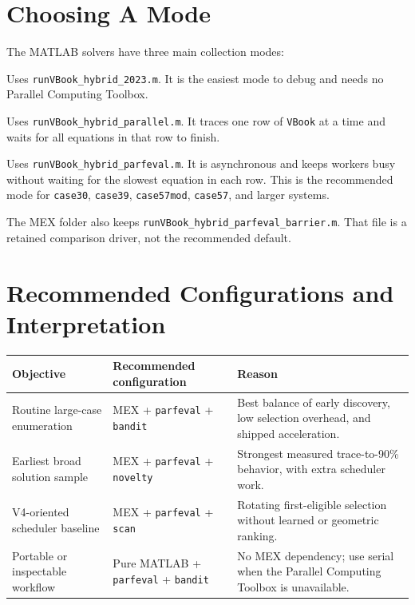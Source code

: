 \documentclass[11pt,a4paper]{article}
\newcommand{\code}[1]{\texttt{#1}}
\begin{document}
\section{Choosing A Mode}

The MATLAB solvers have three main collection modes:

\begin{description}[leftmargin=0em,style=nextline]
\item[\code{serial}] Uses \code{runVBook_hybrid_2023.m}. It is the easiest mode to debug
and needs no Parallel Computing Toolbox.
\item[\code{parfor}] Uses \code{runVBook_hybrid_parallel.m}. It traces one row of
\code{VBook} at a time and waits for all equations in that row to finish.
\item[\code{parfeval}] Uses \code{runVBook_hybrid_parfeval.m}. It is asynchronous and keeps
workers busy without waiting for the slowest equation in each row. This is the recommended
mode for \code{case30}, \code{case39}, \code{case57mod}, \code{case57}, and larger systems.
\end{description}

The MEX folder also keeps \code{runVBook_hybrid_parfeval_barrier.m}. That file is a
retained comparison driver, not the recommended default.

\section{Recommended Configurations and Interpretation}

\begin{center}\small
\begin{tabular}{@{}p{}p{}p{}@{}}
\toprule
\textbf{Objective} & \textbf{Recommended configuration} & \textbf{Reason}\\
\midrule
Routine large-case enumeration & MEX + \code{parfeval} + \code{bandit} &
Best balance of early discovery, low selection overhead, and shipped acceleration.\\
Earliest broad solution sample & MEX + \code{parfeval} + \code{novelty} &
Strongest measured trace-to-90\% behavior, with extra scheduler work.\\
V4-oriented scheduler baseline & MEX + \code{parfeval} + \code{scan} &
Rotating first-eligible selection without learned or geometric ranking.\\
Portable or inspectable workflow & Pure MATLAB + \code{parfeval} + \code{bandit} &
No MEX dependency; use serial when the Parallel Computing Toolbox is unavailable.\\
\bottomrule
\end{tabular}
\end{center}
\end{document}

